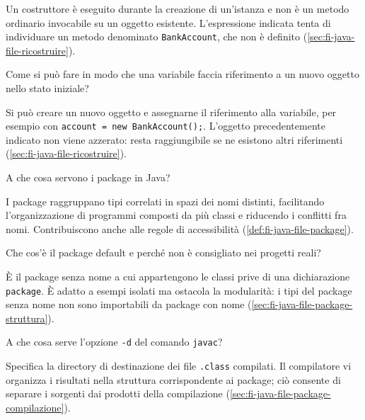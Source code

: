 Un costruttore è eseguito durante la creazione di un'istanza e
non è un metodo ordinario invocabile su un oggetto esistente.
L'espressione indicata tenta di individuare un metodo denominato
\texttt{BankAccount}, che non è definito
(\cref{sec:fi-java-file-ricostruire}).

\begin{exercise}
\label{ex:fi-esercizi-java-file-ricostruire}
Come si può fare in modo che una variabile faccia riferimento a
un nuovo oggetto nello stato iniziale?
\end{exercise}

Si può creare un nuovo oggetto e assegnarne il riferimento alla
variabile, per esempio con \texttt{account = new BankAccount();}.
L'oggetto precedentemente indicato non viene azzerato: resta
raggiungibile se ne esistono altri riferimenti
(\cref{sec:fi-java-file-ricostruire}).

\begin{exercise}
\label{ex:fi-esercizi-java-file-package}
A che cosa servono i package in Java?
\end{exercise}

I package raggruppano tipi correlati in spazi dei nomi distinti,
facilitando l'organizzazione di programmi composti da più classi
e riducendo i conflitti fra nomi. Contribuiscono anche alle
regole di accessibilità
(\cref{def:fi-java-file-package}).

\begin{exercise}
\label{ex:fi-esercizi-java-file-package-default}
Che cos'è il package default e perché non è consigliato nei
progetti reali?
\end{exercise}

È il package senza nome a cui appartengono le classi prive di una
dichiarazione \texttt{package}. È adatto a esempi isolati ma
ostacola la modularità: i tipi del package senza nome non
sono importabili da package con nome
(\cref{sec:fi-java-file-package-struttura}).

\clearpage

\begin{exercise}
\label{ex:fi-esercizi-java-file-opzione-d}
A che cosa serve l'opzione \texttt{-d} del comando \texttt{javac}?
\end{exercise}

Specifica la directory di destinazione dei file \texttt{.class}
compilati. Il compilatore vi organizza i risultati nella struttura
corrispondente ai package; ciò consente di separare i sorgenti
dai prodotti della compilazione
(\cref{sec:fi-java-file-package-compilazione}).


